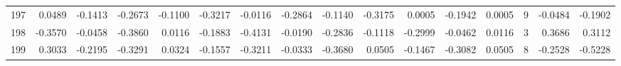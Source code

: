 \begin{tabular}{lrrrrrrrrrrrrrrr}
197 &      0.0489 & -0.1413 & -0.2673 & -0.1100 & -0.3217 & -0.0116 & -0.2864 & -0.1140 & -0.3175 &  0.0005 &  -0.1942 &     0.0005 &      9 &                   -0.0484 &                    -0.1902 \\
198 &     -0.3570 & -0.0458 & -0.3860 &  0.0116 & -0.1883 & -0.4131 & -0.0190 & -0.2836 & -0.1118 & -0.2999 &  -0.0462 &     0.0116 &      3 &                    0.3686 &                     0.3112 \\
199 &      0.3033 & -0.2195 & -0.3291 &  0.0324 & -0.1557 & -0.3211 & -0.0333 & -0.3680 &  0.0505 & -0.1467 &  -0.3082 &     0.0505 &      8 &                   -0.2528 &                    -0.5228 \\
\bottomrule
\end{tabular}
